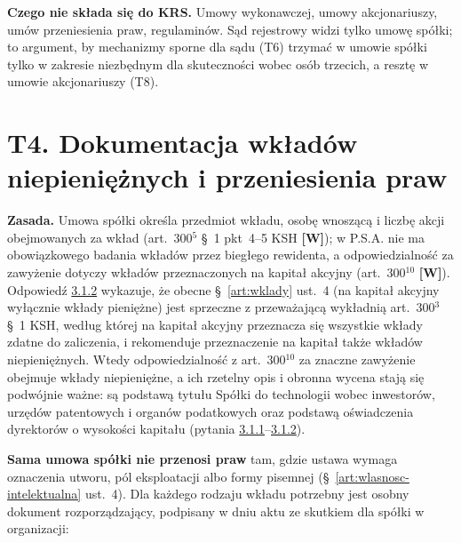 \documentclass[12pt,a4paper]{report}
\newcommand{\Wiar}[1]{\textbf{[#1]}}
\begin{document}
\textbf{Czego nie składa się do KRS.} Umowy wykonawczej, umowy akcjonariuszy, umów przeniesienia praw, regulaminów. Sąd rejestrowy widzi tylko umowę spółki; to argument, by mechanizmy sporne dla sądu (T6) trzymać w umowie spółki tylko w zakresie niezbędnym dla skuteczności wobec osób trzecich, a resztę w umowie akcjonariuszy (T8).

\section*{T4. Dokumentacja wkładów niepieniężnych i przeniesienia praw}

\textbf{Zasada.} Umowa spółki określa przedmiot wkładu, osobę wnoszącą i liczbę akcji obejmowanych za wkład (art.~300$^{5}$ §~1 pkt~4--5 KSH \Wiar{W}); w P.S.A. nie ma obowiązkowego badania wkładów przez biegłego rewidenta, a odpowiedzialność za zawyżenie dotyczy wkładów przeznaczonych na kapitał akcyjny (art.~300$^{10}$ \Wiar{W}). Odpowiedź \hyperref[memo:3.1.2]{3.1.2} wykazuje, że obecne §~\ref{art:wklady} ust.~4 (na kapitał akcyjny wyłącznie wkłady pieniężne) jest sprzeczne z przeważającą wykładnią art.~300$^{3}$ §~1 KSH, według której na kapitał akcyjny przeznacza się wszystkie wkłady zdatne do zaliczenia, i rekomenduje przeznaczenie na kapitał także wkładów niepieniężnych. Wtedy odpowiedzialność z art.~300$^{10}$ za znaczne zawyżenie obejmuje wkłady niepieniężne, a ich rzetelny opis i obronna wycena stają się podwójnie ważne: są podstawą tytułu Spółki do technologii wobec inwestorów, urzędów patentowych i organów podatkowych oraz podstawą oświadczenia dyrektorów o wysokości kapitału (pytania \hyperref[memo:3.1.1]{3.1.1}--\hyperref[memo:3.1.2]{3.1.2}).

\textbf{Sama umowa spółki nie przenosi praw} tam, gdzie ustawa wymaga oznaczenia utworu, pól eksploatacji albo formy pisemnej (§~\ref{art:wlasnosc-intelektualna} ust.~4). Dla każdego rodzaju wkładu potrzebny jest osobny dokument rozporządzający, podpisany w dniu aktu ze skutkiem dla spółki w organizacji:
\end{document}

